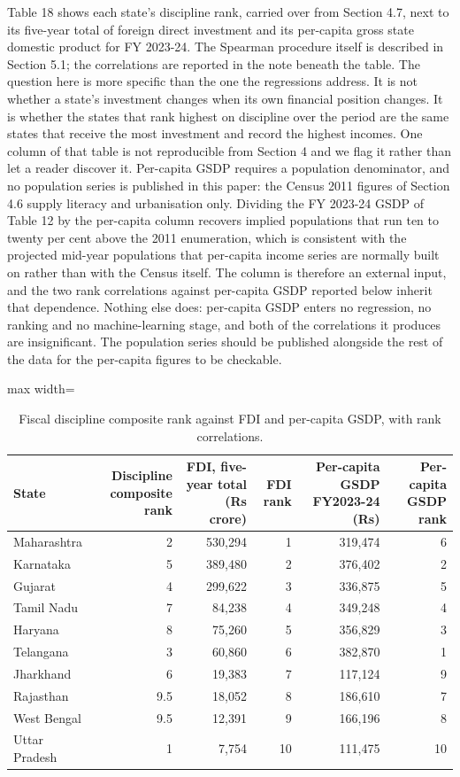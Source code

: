 \documentclass[12pt,a4paper]{article}
\begin{document}
Table 18 shows each state's discipline rank, carried over from Section 4.7, next to its five-year total of foreign direct investment and its per-capita gross state domestic product for FY 2023-24. The Spearman procedure itself is described in Section 5.1; the correlations are reported in the note beneath the table. The question here is more specific than the one the regressions address. It is not whether a state's investment changes when its own financial position changes. It is whether the states that rank highest on discipline over the period are the same states that receive the most investment and record the highest incomes. One column of that table is not reproducible from Section 4 and we flag it rather than let a reader discover it. Per-capita GSDP requires a population denominator, and no population series is published in this paper: the Census 2011 figures of Section 4.6 supply literacy and urbanisation only. Dividing the FY 2023-24 GSDP of Table 12 by the per-capita column recovers implied populations that run ten to twenty per cent above the 2011 enumeration, which is consistent with the projected mid-year populations that per-capita income series are normally built on rather than with the Census itself. The column is therefore an external input, and the two rank correlations against per-capita GSDP reported below inherit that dependence. Nothing else does: per-capita GSDP enters no regression, no ranking and no machine-learning stage, and both of the correlations it produces are insignificant. The population series should be published alongside the rest of the data for the per-capita figures to be checkable.

\begin{table}[H]
\centering
\caption{Fiscal discipline composite rank against FDI and per-capita GSDP, with rank correlations.}
\label{tab:18}
\footnotesize
\begin{adjustbox}{max width=\textwidth}
\begin{tabular}{@{}lrrrrr@{}}
\toprule
State & Discipline composite rank & FDI, five-year total (Rs crore) & FDI rank & Per-capita GSDP FY2023-24 (Rs) & Per-capita GSDP rank \\
\midrule
Maharashtra & 2 & 530,294 & 1 & 319,474 & 6 \\
Karnataka & 5 & 389,480 & 2 & 376,402 & 2 \\
Gujarat & 4 & 299,622 & 3 & 336,875 & 5 \\
Tamil Nadu & 7 & 84,238 & 4 & 349,248 & 4 \\
Haryana & 8 & 75,260 & 5 & 356,829 & 3 \\
Telangana & 3 & 60,860 & 6 & 382,870 & 1 \\
Jharkhand & 6 & 19,383 & 7 & 117,124 & 9 \\
Rajasthan & 9.5 & 18,052 & 8 & 186,610 & 7 \\
West Bengal & 9.5 & 12,391 & 9 & 166,196 & 8 \\
Uttar Pradesh & 1 & 7,754 & 10 & 111,475 & 10 \\
\bottomrule
\end{tabular}
\end{adjustbox}
\end{table}
\end{document}
